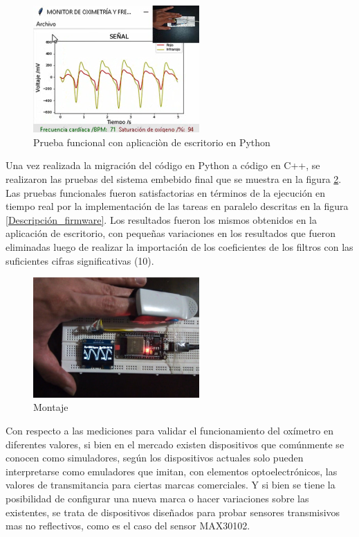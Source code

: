 \documentclass[journal]{IEEEtran}
\begin{document}
\begin{figure}[!h]
	\centering
	\includegraphics[width=2.5in]{resultado_python_real.png}
	\caption{Prueba funcional con aplicaciòn de escritorio en Python}
	\label{resultado_python_real}
\end{figure}


Una vez realizada la migración del código en Python a código en C++, se realizaron las pruebas del sistema embebido final que se muestra en la figura \ref{montaje_final}. Las pruebas funcionales fueron satisfactorias en términos de la ejecución en tiempo real por la implementación de las tareas en paralelo descritas en la figura \ref{Descripción_firmware}. Los resultados fueron los mismos obtenidos en la aplicación de escritorio, con pequeñas variaciones en los resultados que fueron eliminadas luego de realizar la importación de los coeficientes de los filtros con las suficientes cifras significativas (10).

\begin{figure}[!h]
	\centering
	\includegraphics[width=2.5in]{montaje_final.png}
	\caption{Montaje}
	\label{montaje_final}
\end{figure}

Con respecto a las mediciones para validar el funcionamiento del oxímetro en diferentes valores, si bien en el mercado existen dispositivos que comúnmente se conocen como simuladores, según \cite{G_There_is_no_such_thing_as_a_SpO2_simulator} los dispositivos actuales solo pueden interpretarse como emuladores que imitan, con elementos optoelectrónicos, las valores de transmitancia para ciertas marcas comerciales. Y si bien se tiene la posibilidad de configurar una nueva marca o hacer variaciones sobre las existentes, se trata de dispositivos diseñados para probar sensores transmisivos \cite{G_validacion_oximetro_texas_fluke} mas no reflectivos, como es el caso del sensor MAX30102.
\end{document}
